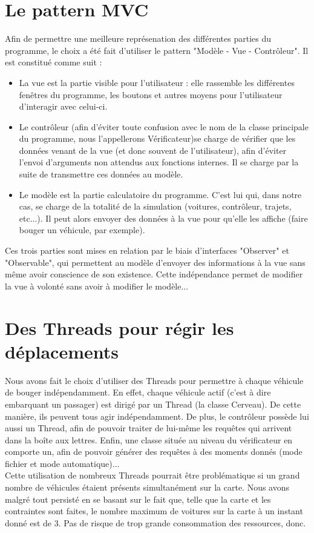 \documentclass[a4paper, titlepage]{report}
\begin{document}
\section{Le pattern MVC}
Afin de permettre une meilleure représenation des différentes parties du programme, le choix a été fait d'utiliser le pattern "Modèle - Vue - Contrôleur". Il est constitué comme suit :\\
\begin{itemize}
\item La vue est la partie visible pour l'utilisateur : elle rassemble les différentes fenêtres du programme, les boutons et autres moyens pour l'utilisateur d'interagir avec celui-ci.
\item Le contrôleur (afin d'éviter toute confusion avec le nom de la classe principale du programme, nous l'appellerons Vérificateur)se charge de vérifier  que les données venant de la vue (et donc souvent de l'utilisateur), afin d'éviter l'envoi d'arguments non attendus aux fonctions internes. Il se charge par la suite de transmettre ces données au modèle.
\item Le modèle est la partie calculatoire du programme. C'est lui qui, dans notre cas, se charge de la totalité de la simulation (voitures, contrôleur, trajets, etc...). Il peut alors envoyer des données à la vue pour qu'elle les affiche (faire bouger un véhicule, par exemple).
\end{itemize}
Ces trois parties sont mises en relation par le biais d'interfaces "Observer" et "Observable", qui permettent au modèle d'envoyer des informations à la vue sans même avoir conscience de son existence. Cette indépendance permet de modifier la vue à volonté sans avoir à modifier le modèle...
\section{Des Threads pour régir les déplacements}

Nous avons fait le choix d'utiliser des Threads pour permettre à chaque véhicule de bouger indépendamment. En effet, chaque véhicule actif (c'est à dire embarquant un passager) est dirigé par un Thread (la classe Cerveau). De cette manière, ils peuvent tous agir indépendamment. De plus, le contrôleur possède lui aussi un Thread, afin de pouvoir traiter de lui-même les requêtes qui arrivent dans la boîte aux lettres. 
Enfin, une classe située au niveau du vérificateur en comporte un, afin de pouvoir générer des requêtes à des moments donnés (mode fichier et mode automatique)...\\
Cette utilisation de nombreux Threads pourrait être problématique si un grand nombre de véhicules étaient présents simultanément sur la carte. Nous avons malgré tout persisté en se basant sur le fait que, telle que la carte et les contraintes sont faites, le nombre maximum de voitures sur la carte à un instant donné est de 3. Pas de risque de trop grande consommation des ressources, donc.
\end{document}
